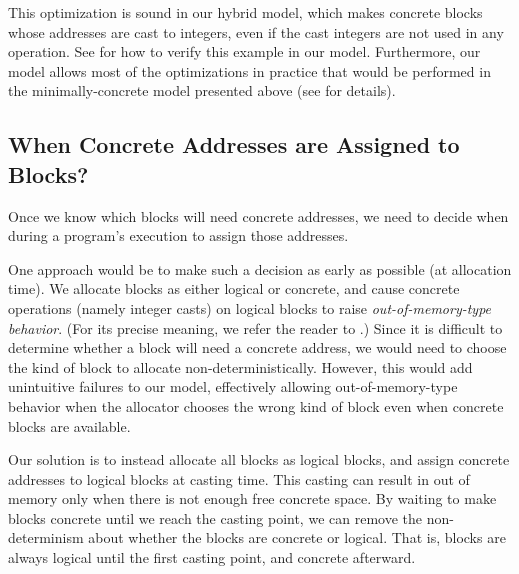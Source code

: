 This optimization is sound in our hybrid model, which makes concrete blocks whose addresses are cast
to integers, even if the cast integers are not used in any operation.  See
 for how to verify this example in our model.
Furthermore, our model allows most of the optimizations in practice that would be performed in the
minimally-concrete model presented above (see  for
details).


\subsection{When Concrete Addresses are Assigned to Blocks?}
\label{idea:ownership}

Once we know which blocks will need concrete addresses, we need to
decide when during a program's execution to assign those addresses.

One approach would be to make such a decision as early as possible (\ie at allocation time). We
allocate blocks as either logical or concrete, and cause concrete operations (namely integer casts)
on logical blocks to raise \emph{out-of-memory-type behavior}.  (For its precise meaning, we refer
the reader to .)  Since it is difficult to determine
whether a block will need a concrete address,
we would need to choose the kind of block to allocate
non-deterministically. However, this would add unintuitive failures to
our model, effectively allowing out-of-memory-type behavior when the
allocator chooses the wrong kind of block even when concrete blocks
are available.

Our solution is to instead allocate all blocks as logical blocks, and assign concrete addresses to logical blocks at casting time. This casting can result in out of memory only when there is not enough free concrete space. By waiting to make blocks concrete until we reach the casting point,
we can remove the non-determinism about whether the blocks are
concrete or logical. That is, blocks are always logical until the
first casting point, and concrete afterward.

